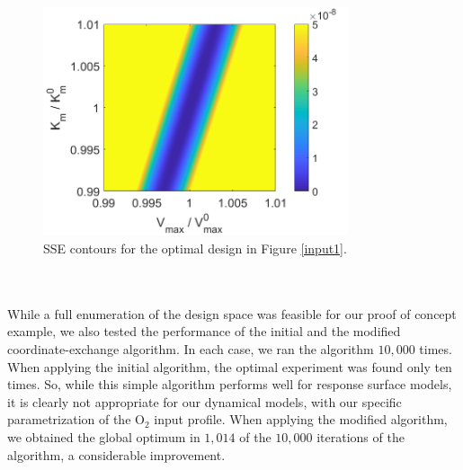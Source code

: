 \begin{figure}
	\centering
	\includegraphics[width=0.8\textwidth]{figure/paper 1/compare1.png}
	\caption{SSE contours for the optimal design in Figure \ref{input1}.}
	\label{figCompare1}
\end{figure}
\\
\\
While a full enumeration of the design space was feasible for our proof of concept example, we also tested the performance of the initial and the modified coordinate-exchange algorithm. In each case, we ran the algorithm $10,000$ times. When applying the initial algorithm, the optimal experiment was found only ten times. So, while this simple algorithm performs well for response surface models, it is clearly not appropriate for our dynamical models, with our specific parametrization of the $\text{O}_2$ input profile. When applying the modified algorithm, we obtained the global optimum in $1,014$ of the $10,000$ iterations of the algorithm, a considerable improvement.
